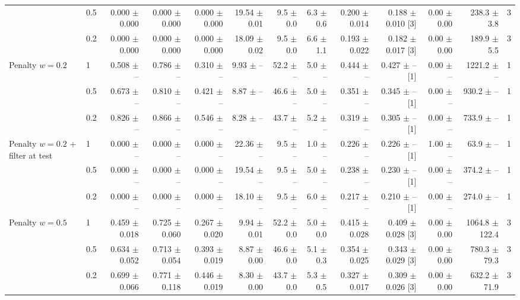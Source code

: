 {\begin{tabular}{llrrrrrrrrrrr}
 & 0.5 & 0.000 $\pm$ 0.000 & 0.000 $\pm$ 0.000 & 0.000 $\pm$ 0.000 & 19.54 $\pm$ 0.01 & 9.5 $\pm$ 0.0 & 6.3 $\pm$ 0.6 & 0.200 $\pm$ 0.014 & 0.188 $\pm$ 0.010 [3] & 0.00 $\pm$ 0.00 & 238.3 $\pm$ 3.8 & 3 \\
 & 0.2 & 0.000 $\pm$ 0.000 & 0.000 $\pm$ 0.000 & 0.000 $\pm$ 0.000 & 18.09 $\pm$ 0.02 & 9.5 $\pm$ 0.0 & 6.6 $\pm$ 1.1 & 0.193 $\pm$ 0.022 & 0.182 $\pm$ 0.017 [3] & 0.00 $\pm$ 0.00 & 189.9 $\pm$ 5.5 & 3 \\
\addlinespace
Penalty $w{=}0.2$ & 1 & 0.508 $\pm$ -- & 0.786 $\pm$ -- & 0.310 $\pm$ -- & 9.93 $\pm$ -- & 52.2 $\pm$ -- & 5.0 $\pm$ -- & 0.444 $\pm$ -- & 0.427 $\pm$ -- [1] & 0.00 $\pm$ -- & 1221.2 $\pm$ -- & 1 \\
 & 0.5 & 0.673 $\pm$ -- & 0.810 $\pm$ -- & 0.421 $\pm$ -- & 8.87 $\pm$ -- & 46.6 $\pm$ -- & 5.0 $\pm$ -- & 0.351 $\pm$ -- & 0.345 $\pm$ -- [1] & 0.00 $\pm$ -- & 930.2 $\pm$ -- & 1 \\
 & 0.2 & 0.826 $\pm$ -- & 0.866 $\pm$ -- & 0.546 $\pm$ -- & 8.28 $\pm$ -- & 43.7 $\pm$ -- & 5.2 $\pm$ -- & 0.319 $\pm$ -- & 0.305 $\pm$ -- [1] & 0.00 $\pm$ -- & 733.9 $\pm$ -- & 1 \\
\addlinespace
Penalty $w{=}0.2$ + filter at test & 1 & 0.000 $\pm$ -- & 0.000 $\pm$ -- & 0.000 $\pm$ -- & 22.36 $\pm$ -- & 9.5 $\pm$ -- & 1.0 $\pm$ -- & 0.226 $\pm$ -- & 0.226 $\pm$ -- [1] & 1.00 $\pm$ -- & 63.9 $\pm$ -- & 1 \\
 & 0.5 & 0.000 $\pm$ -- & 0.000 $\pm$ -- & 0.000 $\pm$ -- & 19.54 $\pm$ -- & 9.5 $\pm$ -- & 5.0 $\pm$ -- & 0.238 $\pm$ -- & 0.230 $\pm$ -- [1] & 0.00 $\pm$ -- & 374.2 $\pm$ -- & 1 \\
 & 0.2 & 0.000 $\pm$ -- & 0.000 $\pm$ -- & 0.000 $\pm$ -- & 18.10 $\pm$ -- & 9.5 $\pm$ -- & 6.0 $\pm$ -- & 0.217 $\pm$ -- & 0.210 $\pm$ -- [1] & 0.00 $\pm$ -- & 274.0 $\pm$ -- & 1 \\
\addlinespace
Penalty $w{=}0.5$ & 1 & 0.459 $\pm$ 0.018 & 0.725 $\pm$ 0.060 & 0.267 $\pm$ 0.020 & 9.94 $\pm$ 0.01 & 52.2 $\pm$ 0.0 & 5.0 $\pm$ 0.0 & 0.415 $\pm$ 0.028 & 0.409 $\pm$ 0.028 [3] & 0.00 $\pm$ 0.00 & 1064.8 $\pm$ 122.4 & 3 \\
 & 0.5 & 0.634 $\pm$ 0.052 & 0.713 $\pm$ 0.054 & 0.393 $\pm$ 0.019 & 8.87 $\pm$ 0.00 & 46.6 $\pm$ 0.0 & 5.1 $\pm$ 0.3 & 0.354 $\pm$ 0.025 & 0.343 $\pm$ 0.029 [3] & 0.00 $\pm$ 0.00 & 780.3 $\pm$ 79.3 & 3 \\
 & 0.2 & 0.699 $\pm$ 0.066 & 0.771 $\pm$ 0.118 & 0.446 $\pm$ 0.019 & 8.30 $\pm$ 0.00 & 43.7 $\pm$ 0.0 & 5.3 $\pm$ 0.5 & 0.327 $\pm$ 0.017 & 0.309 $\pm$ 0.026 [3] & 0.00 $\pm$ 0.00 & 632.2 $\pm$ 71.9 & 3 \\

\end{tabular}}
